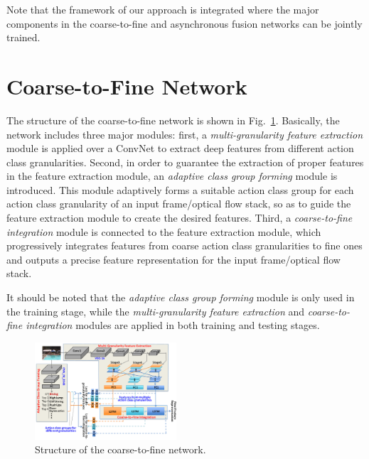 \documentclass[letterpaper]{article}
\begin{document}
Note that the framework of our approach is integrated where the major components in the coarse-to-fine and asynchronous fusion networks can be jointly trained.%








\section{Coarse-to-Fine Network\label{section:Coarse-to-fine}}



The structure of the coarse-to-fine network is shown in Fig.~\ref{fig:coarse-to-fine}. Basically, the network includes three major modules: first, a \emph{multi-granularity feature extraction} module is applied over a ConvNet to extract deep features from different action class granularities. Second, in order to guarantee the extraction of proper features in the feature extraction module, an \emph{adaptive class group forming} module is introduced. This module adaptively forms a suitable action class group for each action class granularity of an input frame/optical flow stack, so as to guide the feature extraction module to create the desired features. Third, a \emph{coarse-to-fine integration} module is connected to the feature extraction module, which progressively integrates features from coarse action class granularities to fine ones and outputs a precise feature representation for the input frame/optical flow stack.

It should be noted that the \emph{adaptive class group forming} module is only used in the training stage, while the \emph{multi-granularity feature extraction} and \emph{coarse-to-fine integration} modules are applied in both training and testing stages.



\begin{figure}
  \centering
  \includegraphics[width=0.47\textwidth,height=0.32\textwidth]{./figures1/coarse-to-fine.png}
  \caption{Structure of the coarse-to-fine network.}
    \label{fig:coarse-to-fine}
\end{figure}
\end{document}
